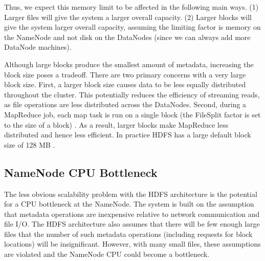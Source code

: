 \documentclass[11pt, a4paper]{article}
\begin{document}
\begin{multicols*}{2}
Thus, we expect this memory limit to be affected in the following main ways. (1) Larger files will give the system a larger overall capacity. (2) Larger blocks will give the system larger overall capacity, assuming the limiting factor is memory on the NameNode and not disk on the DataNodes (since we can always add more DataNode machines).

Although large blocks produce the smallest amount of metadata, increasing the block size poses a tradeoff. There are two primary concerns with a very large block size. First, a larger block size causes data to be less equally distributed throughout the cluster. This potentially reduces the efficiency of streaming reads, as file operations are less distributed across the DataNodes. Second, during a MapReduce job, each map task is run on a single block (the FileSplit factor is set to the size of a block) \cite{HdfsDefaults}. As a result, larger blocks make MapReduce less distributed and hence less efficient. In practice HDFS has a large default block size of 128 MB \cite{HdfsDefaults}.

\subsection{NameNode CPU Bottleneck}
The less obvious scalability problem with the HDFS architecture is the potential for a CPU bottleneck at the NameNode. The system is built on the assumption that metadata operations are inexpensive relative to network communication and file I/O. The HDFS architecture also assumes that there will be few enough large files that the number of such metadata operations (including requests for block locations) will be insignificant. However, with many small files, these assumptions are violated and the NameNode CPU could become a bottleneck.



\end{multicols*}
\end{document}
